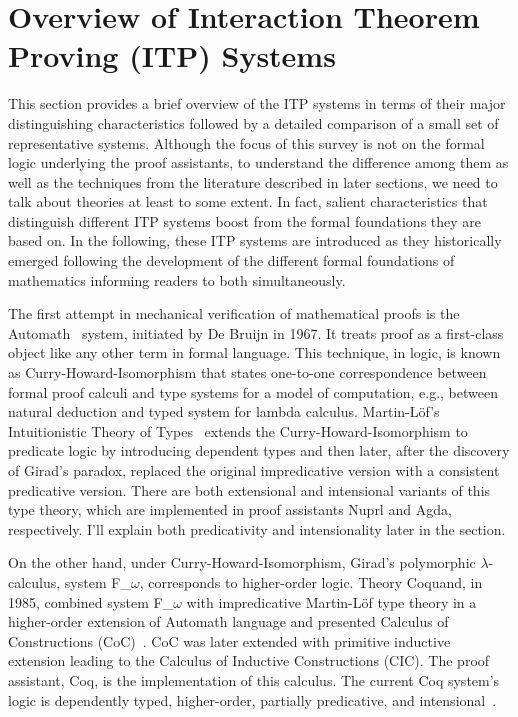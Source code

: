 \section{Overview of Interaction Theorem Proving (ITP) Systems}
\label{sec:overview}

This section provides a brief overview of the ITP systems in terms of their major distinguishing characteristics followed by a detailed comparison of a small set of representative systems. Although the focus of this survey is not on the formal logic underlying the proof assistants, to understand the difference among them as well as the techniques from the literature described in later sections, we need to talk about theories at least to some extent. In fact, salient characteristics that distinguish different ITP systems boost from the formal foundations they are based on. In the following, these ITP systems are introduced as they historically emerged following the development of the different formal foundations of mathematics informing readers to both simultaneously. %

The first attempt in mechanical verification of mathematical proofs is the Automath~\cite{Bruijn_1983} system, initiated by De Bruijn in 1967. It treats proof as a first-class object like any other term in formal language. This technique, in logic, is known as Curry-Howard-Isomorphism that states one-to-one correspondence between formal proof calculi and type systems for a model of computation, e.g., between natural deduction and typed system for lambda calculus. %
Martin-L{\"o}f’s Intuitionistic Theory of Types~\cite{Lof_1984} extends the Curry-Howard-Isomorphism to predicate logic by introducing dependent types and then later, after the discovery of Girad's paradox, replaced the original impredicative version with a consistent predicative version. There are both extensional and intensional variants of this type theory, which are implemented in proof assistants Nuprl and Agda, respectively. I'll explain both predicativity and intensionality later in the section. 

On the other hand, under Curry-Howard-Isomorphism, Girad's polymorphic $\lambda$-calculus, system F\_$\omega$, corresponds to higher-order logic. Theory Coquand, in 1985, combined system F\_$\omega$ with impredicative Martin-L{\"o}f type theory in a higher-order extension of Automath language and presented Calculus of Constructions (CoC)~\cite{Coquand_Huet_1988}. CoC was later extended with primitive inductive extension leading to the Calculus of Inductive Constructions (CIC). The proof assistant, Coq, is the implementation of this calculus. The current Coq system's logic is dependently typed, higher-order, partially predicative, and intensional~\cite{Coq_2019}.

